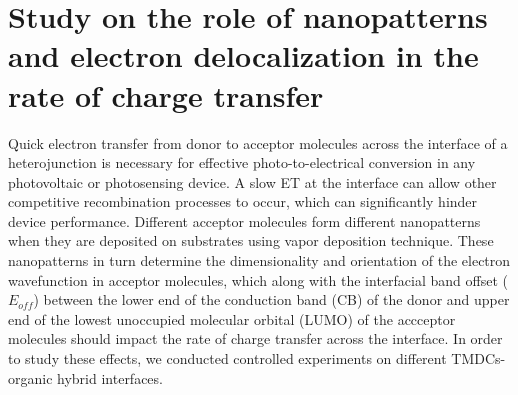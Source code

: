 \documentclass[12pt]{article}
\begin{document}
\section{Study on the role of nanopatterns and electron delocalization in the rate of charge transfer}
Quick electron transfer from donor to acceptor molecules across the interface of a heterojunction is necessary for effective photo-to-electrical conversion in any photovoltaic or photosensing device. A slow ET at the interface can allow other competitive recombination processes to occur, which can significantly hinder device performance. Different acceptor molecules form different nanopatterns when they are deposited on substrates using vapor deposition technique. These nanopatterns in turn determine the dimensionality and orientation of the electron wavefunction in acceptor molecules, which along with the interfacial band offset ($E_{off}$) between the lower end of the conduction band (CB) of the donor and upper end of the lowest unoccupied molecular orbital (LUMO) of the accceptor molecules should impact the rate of charge transfer across the interface. In order to study these effects, we conducted controlled experiments on different TMDCs-organic hybrid interfaces. 
\end{document}
